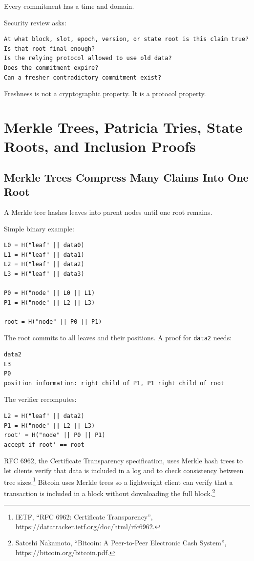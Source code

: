 Every commitment has a time and domain.

Security review asks:

\begin{lstlisting}
At what block, slot, epoch, version, or state root is this claim true?
Is that root final enough?
Is the relying protocol allowed to use old data?
Does the commitment expire?
Can a fresher contradictory commitment exist?
\end{lstlisting}

Freshness is not a cryptographic property. It is a protocol property.

\section{Merkle Trees, Patricia Tries, State Roots, and Inclusion Proofs}

\subsection{Merkle Trees Compress Many Claims Into One Root}

A Merkle tree hashes leaves into parent nodes until one root remains.

Simple binary example:

\begin{lstlisting}
L0 = H("leaf" || data0)
L1 = H("leaf" || data1)
L2 = H("leaf" || data2)
L3 = H("leaf" || data3)

P0 = H("node" || L0 || L1)
P1 = H("node" || L2 || L3)

root = H("node" || P0 || P1)
\end{lstlisting}

The root commits to all leaves and their positions. A proof for
\passthrough{\lstinline!data2!} needs:

\begin{lstlisting}
data2
L3
P0
position information: right child of P1, P1 right child of root
\end{lstlisting}

The verifier recomputes:

\begin{lstlisting}
L2 = H("leaf" || data2)
P1 = H("node" || L2 || L3)
root' = H("node" || P0 || P1)
accept if root' == root
\end{lstlisting}

RFC 6962, the Certificate Transparency specification, uses Merkle hash
trees to let clients verify that data is included in a log and to check
consistency between tree sizes.\footnote{IETF, ``RFC 6962: Certificate
  Transparency'', https://datatracker.ietf.org/doc/html/rfc6962.}
Bitcoin uses Merkle trees so a lightweight client can verify that a
transaction is included in a block without downloading the full
block.\footnote{Satoshi Nakamoto, ``Bitcoin: A Peer-to-Peer Electronic
  Cash System'', https://bitcoin.org/bitcoin.pdf.}

